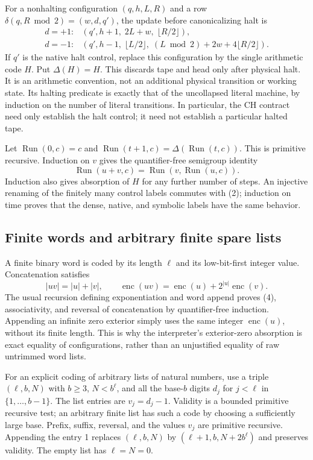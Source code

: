 \documentclass[11pt]{article}
\newcommand{\Run}{\operatorname{Run}}
\newcommand{\enc}{\operatorname{enc}}
\begin{document}
For a nonhalting configuration $(q,h,L,R)$ and a row
$\delta(q,R\bmod 2)=(w,d,q')$, the update before canonicalizing halt is
\[
\begin{array}{ll}
d=+1:&(q',h+1,\;2L+w,\;\lfloor R/2\rfloor),\\[2pt]
d=-1:&(q',h-1,\;\lfloor L/2\rfloor,\;
       (L\bmod 2)+2w+4\lfloor R/2\rfloor).
\end{array}                                                    \tag{2}
\]
If $q'$ is the native halt control, replace this configuration by the single
arithmetic code $H$.  Put $\Delta(H)=H$.  This discards tape and head only
after physical halt.  It is an arithmetic convention, not an additional
physical transition or working state.  Its halting predicate is exactly
that of the uncollapsed literal machine, by induction on the number of
literal transitions.  In particular, the CH contract need only establish
the halt control; it need not establish a particular halted tape.

Let $\Run(0,c)=c$ and
$\Run(t+1,c)=\Delta(\Run(t,c))$.  This is primitive recursive.  Induction
on $v$ gives the quantifier-free semigroup identity
\[
 \Run(u+v,c)=\Run(v,\Run(u,c)).                                  \tag{3}
\]
Induction also gives absorption of $H$ for any further number of steps.
An injective renaming of the finitely many control labels commutes with
(2); induction on time proves that the dense, native, and symbolic labels
have the same behavior.

\subsection{Finite words and arbitrary finite spare lists}

A finite binary word is coded by its length $\ell$ and its low-bit-first
integer value.  Concatenation satisfies
\[
 |uv|=|u|+|v|,\qquad
 \enc(uv)=\enc(u)+2^{|u|}\enc(v).                                 \tag{4}
\]
The usual recursion defining exponentiation and word append proves (4),
associativity, and reversal of concatenation by quantifier-free induction.
Appending an infinite zero exterior simply uses the same integer
$\enc(u)$, without its finite length.  This is why the interpreter's
exterior-zero absorption is exact equality of configurations, rather than
an unjustified equality of raw untrimmed word lists.

For an explicit coding of arbitrary lists of natural numbers, use a triple
$(\ell,b,N)$ with $b\geq3$, $N<b^\ell$, and all the base-$b$ digits
$d_j$ for $j<\ell$ in $\{1,\ldots,b-1\}$.  The list entries are
$v_j=d_j-1$.  Validity is a bounded primitive recursive test; an arbitrary
finite list has such a code by choosing a sufficiently large base.  Prefix,
suffix, reversal, and the values $v_j$ are primitive recursive.  Appending
the entry 1 replaces $(\ell,b,N)$ by
$(\ell+1,b,N+2b^\ell)$ and preserves validity.  The empty list has
$\ell=N=0$.
\end{document}
